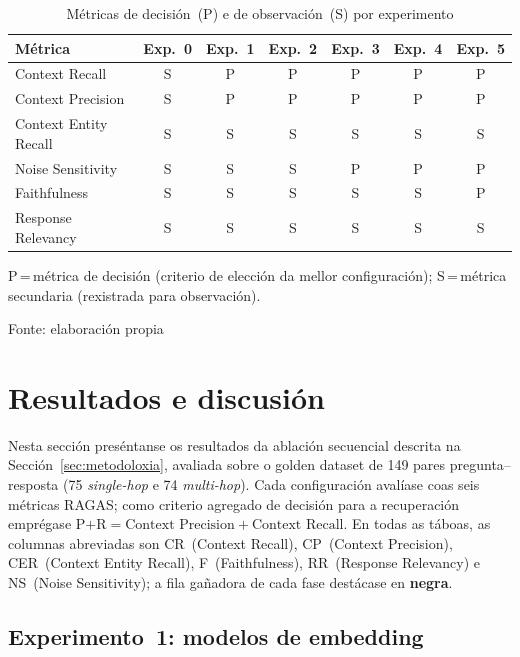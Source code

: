 \documentclass[11pt, a4paper, oneside]{report}
\newcommand{\fonte}[1]{%
  \par\smallskip
  {\centering\fontsize{9}{11}\selectfont Fonte: #1\par}}
\begin{document}
\begin{table}[H]
  \centering
  \caption{Métricas de decisión~(P) e de observación~(S) por experimento}
  \label{tab:metricas_experimentos}
  \begin{tabular}{lcccccc}
    \toprule
    \textbf{Métrica}       & \textbf{Exp.~0} & \textbf{Exp.~1} & \textbf{Exp.~2}
                           & \textbf{Exp.~3} & \textbf{Exp.~4} & \textbf{Exp.~5} \\
    \midrule
    Context Recall         & S & P & P & P & P & P \\
    Context Precision      & S & P & P & P & P & P \\
    Context Entity Recall  & S & S & S & S & S & S \\
    Noise Sensitivity      & S & S & S & P & P & P \\
    Faithfulness           & S & S & S & S & S & P \\
    Response Relevancy     & S & S & S & S & S & S \\
    \bottomrule
  \end{tabular}

  \smallskip
  {\footnotesize
    P\,=\,métrica de decisión (criterio de elección da mellor configuración);
    S\,=\,métrica secundaria (rexistrada para observación).
  }
  \fonte{elaboración propia}
\end{table}


\section{Resultados e discusión}
\label{sec:resultados}

Nesta sección preséntanse os resultados da ablación secuencial descrita na
Sección~\ref{sec:metodoloxia}, avaliada sobre o golden dataset de 149 pares
pregunta--resposta (75 \textit{single-hop} e 74 \textit{multi-hop}). Cada
configuración avalíase coas seis métricas RAGAS; como criterio agregado de decisión
para a recuperación emprégase $\text{P{+}R} = \text{Context Precision} +
\text{Context Recall}$. En todas as táboas, as columnas abreviadas son CR~(Context
Recall), CP~(Context Precision), CER~(Context Entity Recall), F~(Faithfulness),
RR~(Response Relevancy) e NS~(Noise Sensitivity); a fila gañadora de cada fase
destácase en \textbf{negra}.

\subsection{Experimento~1: modelos de embedding}
\label{sec:res_exp1}
\end{document}
